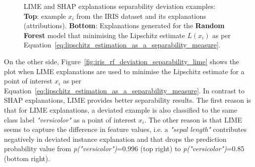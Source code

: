 \documentclass[english]{tktltiki2}
\theoremstyle{definition}
\theoremstyle{remark}
\begin{document}
\begin{figure}[H]
	\hspace*{\fill}%
	\caption{LIME and SHAP explanations separability deviation examples: \textbf{Top}: example $x_i$ from the IRIS dataset and its explanations (attributions). \textbf{Bottom}: Explanations generated for the \textbf{Random Forest} model that minimising the Lipschitz estimate $L(x_i)$ as per Equation~\eqref{eq:lipschitz_estimation_as_a_separability_measure}.}%
	\label{fig:iris_rf_deviation_separability}%
\end{figure}


On the other side, Figure~\ref{fig:iris_rf_deviation_separability_lime} shows the plot when LIME explanations are used to minimise the Lipschitz estimate for a point of interest $x_i$ as per Equation~\eqref{eq:lipschitz_estimation_as_a_separability_measure}. In contrast to SHAP explanations, LIME provides better separability results. The first reason is that for LIME explanations, a deviated example is also classified to the same class label \textit{"versicolor"} as a point of interest $x_i$. The other reason is that LIME seems to capture the difference in feature values, i.e. a \textit{"sepal length"} contributes negatively in deviated instance explanation and that drops the prediction probability value from \textit{p("versicolor")}=0.996 (top right) to \textit{p("versicolor")}=0.85 (bottom right).
\end{document}
